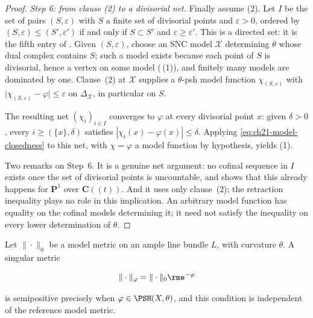\begin{proof}
\emph{Step 6: from clause \textup{(2)} to a divisorial net.}
Finally assume (2).  Let $I$ be the set of pairs $(S,\varepsilon)$ with
$S$ a finite set of divisorial points and $\varepsilon>0$, ordered by
$(S,\varepsilon)\leq(S',\varepsilon')$ if and only if $S\subset S'$ and
$\varepsilon\geq\varepsilon'$.  This is a directed set: it is the fifth
entry of .  Given $(S,\varepsilon)$,
choose an SNC model $\mathcal X$ determining $\theta$ whose dual complex
contains $S$; such a model exists because each point of $S$ is
divisorial, hence a vertex on some model
(\,(1)), and finitely many models are
dominated by one.  Clause~(2) at $\mathcal X$ supplies a $\theta$-psh
model function $\chi_{(S,\varepsilon)}$ with
$\lvert\chi_{(S,\varepsilon)}-\varphi\rvert\leq\varepsilon$ on
$\Delta_{\mathcal X}$, in particular on $S$.

The resulting net $(\chi_i)_{i\in I}$ converges to $\varphi$ at every
divisorial point $x$: given $\delta>0$, every
$i\geq(\{x\},\delta)$ satisfies $|\chi_i(x)-\varphi(x)|\leq\delta$.
Applying \eqref{eq:ch21-model-closedness} to this net, with $\chi=\varphi$
a model function by hypothesis, yields (1).

Two remarks on Step~6.  It is a genuine net argument: no cofinal sequence in
$I$ exists once the set of divisorial points is uncountable, and
 shows that this already happens for
$\mathbf P^1$ over $\mathbf C((t))$.  And it uses only clause~(2); the
retraction inequality plays no role in this implication.  An arbitrary
model function has equality on the cofinal models determining it; it need
not satisfy the inequality on every lower determination of $\theta$.
\end{proof}

\begin{corollary}\label{cor:ch21-reference-independence}
Let $\|\cdot\|_0$ be a model metric on an ample line bundle $L$, with
curvature $\theta$.  A singular metric

\begin{equation}
\label{eq:ch21-singular-metric}
                         \|\cdot\|_\varphi
                         =\|\cdot\|_0\rme^{-\varphi}
\end{equation}

is semipositive precisely when $\varphi\in\PSH(X,\theta)$, and this
condition is independent of the reference model metric.
\end{corollary}

